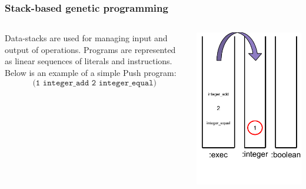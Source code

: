 \documentclass{beamer}
\newcommand{\linespace}{\vskip 0.25cm}
\begin{document}
\begin{frame}
	\frametitle{Stack-based genetic programming}
	\begin{columns}
		\begin{column}{0.65\textwidth}
			Data-stacks are used for managing input and output of operations.
			\linespace
			\linespace
			\linespace
			Programs are represented as linear sequences of literals and instructions. Below is an example of a simple Push program:
			\[\texttt{(1 integer\_add 2 integer\_equal)}\]
		\end{column}
		\begin{column}{0.35\textwidth}
			\includegraphics[height=.7\textheight]{Illustrations/stack_3.PDF}
		\end{column}
	\end{columns}
\end{frame}
\end{document}
